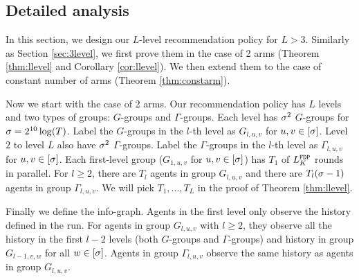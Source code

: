 
\subsection{Detailed analysis}
\label{sec:llevel-details}

In this section, we design our $L$-level recommendation policy for $L > 3$. Similarly as Section \ref{sec:3level}, we first prove them in the case of 2 arms (Theorem \ref{thm:llevel} and Corollary \ref{cor:llevel}). We then extend them to the case of constant number of arms (Theorem \ref{thm:constarm}).

Now we start with the case of 2 arms. Our recommendation policy has $L$ levels and two types of groups: $G$-groups and $\Gamma$-groups. Each level has $\sigma^2$ $G$-groups for $\sigma = 2^{10}\log(T)$. Label the $G$-groups in the $l$-th level as $G_{l,u,v}$ for $u,v \in [\sigma]$. Level $2$ to level $L$ also have $\sigma^2$ $\Gamma$-groups. Label the $\Gamma$-groups in the $l$-th level as $\Gamma_{l,u,v}$ for $u,v \in [\sigma]$. Each first-level group ($G_{1,u,v}$ for $u,v\in [\sigma]$) has $T_1$ \ALGG of $L^\mathtt{FDP}_K$ rounds in parallel. For $l \geq 2$, there are $T_l$ agents in group $G_{l,u,v}$ and there are $T_l (\sigma-1)$ agents in group $\Gamma_{l,u,v}$. We will pick $T_1,...,T_L$ in the proof of Theorem \ref{thm:llevel}.

Finally we define the info-graph. Agents in the first level only observe the history defined in the \ALGG run. For agents in group $G_{l,u,v}$ with $l\geq 2$, they observe all the history in the first $l-2$ levels (both $G$-groups and $\Gamma$-groups) and history in group $G_{l-1,v,w}$ for all $w \in [\sigma]$. Agents in group $\Gamma_{l,u,v}$ observe the same history as agents in group $G_{l,u,v}$.


